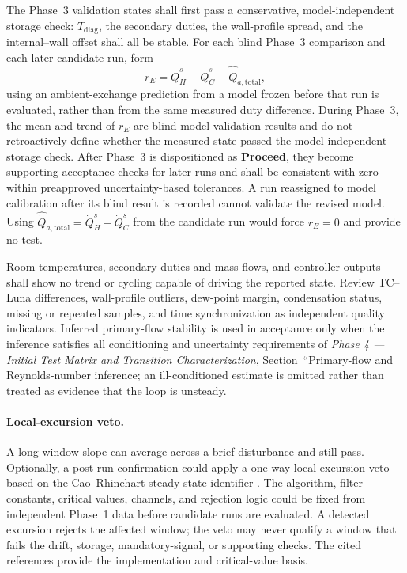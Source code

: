 \documentclass[11pt]{article}
\newcommand{\Tdiag}{T_{\mathrm{diag}}}
\newcommand{\QHs}{\dot Q_{H}^{s}}
\newcommand{\QCs}{\dot Q_{C}^{s}}
\newcommand{\PhaseFourDoc}{\textit{Phase 4 --- Initial Test Matrix and Transition Characterization}}
\begin{document}
The Phase~3 validation states shall first pass a conservative, model-independent storage check: $\Tdiag$, the secondary duties, the wall-profile spread, and the internal--wall offset shall all be stable. For each blind Phase~3 comparison and each later candidate run, form
\begin{equation}
    r_E
    =
    \QHs-\QCs-\widehat{\dot Q}_{a,\mathrm{total}},
    \label{eq:energy_residual}
\end{equation}
using an ambient-exchange prediction from a model frozen before that run is evaluated, rather than from the same measured duty difference. During Phase~3, the mean and trend of $r_E$ are blind model-validation results and do not retroactively define whether the measured state passed the model-independent storage check. After Phase~3 is dispositioned as \textbf{Proceed}, they become supporting acceptance checks for later runs and shall be consistent with zero within preapproved uncertainty-based tolerances. A run reassigned to model calibration after its blind result is recorded cannot validate the revised model. Using $\widehat{\dot Q}_{a,\mathrm{total}}=\QHs-\QCs$ from the candidate run would force $r_E=0$ and provide no test.

Room temperatures, secondary duties and mass flows, and controller outputs shall show no trend or cycling capable of driving the reported state. Review TC--Luna differences, wall-profile outliers, dew-point margin, condensation status, missing or repeated samples, and time synchronization as independent quality indicators. Inferred primary-flow stability is used in acceptance only when the inference satisfies all conditioning and uncertainty requirements of \PhaseFourDoc, Section~``Primary-flow and Reynolds-number inference; an ill-conditioned estimate is omitted rather than treated as evidence that the loop is unsteady.

\paragraph{Local-excursion veto.}
A long-window slope can average across a brief disturbance and still pass. Optionally, a post-run confirmation could apply a one-way local-excursion veto based on the Cao--Rhinehart steady-state identifier \cite{cao1995,cao1997}. The algorithm, filter constants, critical values, channels, and rejection logic could be fixed from independent Phase~1 data before candidate runs are evaluated. A detected excursion rejects the affected window; the veto may never qualify a window that fails the drift, storage, mandatory-signal, or supporting checks. The cited references provide the implementation and critical-value basis.
\end{document}
